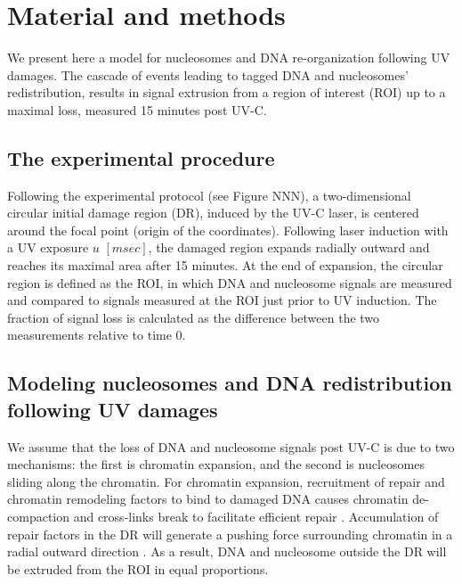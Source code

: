 \documentclass[12pt]{article}
\begin{document}
 \section{Material and methods} 
	
	We present here a model for nucleosomes and DNA re-organization following
	UV damages. The cascade of events leading to tagged DNA and nucleosomes'
	redistribution, results in signal extrusion from a region of interest (ROI) up
	to a maximal loss, measured 15 minutes post UV-C.
	
 \subsection{The experimental procedure}
	Following the experimental protocol (see Figure NNN), a two-dimensional circular initial damage region (DR), induced by the UV-C laser, is centered around the focal point (origin of the coordinates). Following
	laser induction with a UV exposure $u$ $[msec]$, the damaged region expands radially outward and reaches its maximal area after 15 minutes. At the end of expansion, the circular region is defined as the ROI, in which DNA and nucleosome signals are measured and compared to signals measured at the ROI just prior to UV induction. The fraction of signal loss is calculated as the difference between the two measurements relative to time 0.  
	
	\subsection{Modeling nucleosomes and DNA redistribution following UV damages}
	We assume that the loss of DNA and nucleosome signals post UV-C is due
	to two mechanisms: the first is chromatin expansion, and the second is nucleosomes sliding along the chromatin. For chromatin expansion, recruitment of repair and chromatin remodeling factors to bind to damaged DNA causes chromatin de-compaction and cross-links break \cite{luijsterburg2012ddb2} to facilitate efficient repair \cite{gaillard2003chromatin}. Accumulation of repair factors in the DR will generate a pushing force surrounding chromatin in a radial outward direction \cite{dinant2007activation}. As a result, DNA and nucleosome outside the DR will be extruded from the ROI in equal proportions. 
	
\end{document}
